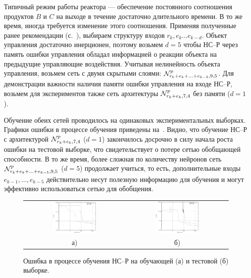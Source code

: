 Типичный режим работы реактора --- обеспечение постоянного соотношения
продуктов $B$ и $C$ на выходе в течение достаточно длительного
времени.  В то же время, иногда требуется изменение этого соотношения.
Применяя полученные ранее рекомендации
(с.~\pageref{nnc-inputs-rules}), выбираем структуру входов
$r_k,e_k\ldots e_{k-d}$.  Объект управления достаточно инерционен,
поэтому возьмем $d=5$ чтобы НС--Р через память ошибки управления
обладал информацией о реакции объекта на предыдущие управляющие
воздействия.  Учитывая нелинейность объекта управления, возьмем сеть с
двумя скрытыми слоями: $\mathcal{N}^p_{r_k+e_k+\ldots+e_{k-5},9,5}$.  Для
демонстрации важности наличия памяти ошибки управления на входе НС--Р,
возьмем для экспериментов также сеть архитектуры $\mathcal{N}^p_{r_k+e_k,7,4}$
без памяти ($d=1$).

Обучение обеих сетей проводилось на одинаковых экспериментальных
выборках.  Графики ошибки в процессе обучения приведены
на~.  Видно, что обучение НС--Р
с архитектурой $\mathcal{N}^p_{r_k+e_k,7,4}$ ($d=1$) закончилось досрочно в
силу начала роста ошибки на тестовой выборке, что свидетельствует о
потере сетью обобщающей способности.  В то же время, более сложная по
количеству нейронов сеть $\mathcal{N}^p_{r_k+e_k+\ldots+e_{k-5},9,5}$ ($d=5$)
продолжает учиться, то есть, дополнительные входы
$e_{k-1},\ldots,e_{k-5}$ действительно несут полезную информацию для
обучения и могут эффективно использоваться сетью для обобщения.

\begin{figure}[h]
  \centering
  \begin{tabular}{cc}
    \includegraphics[width=0.45\textwidth,%
      totalheight=0.25\textheight]{cstr_e5r1_vs_e1r1_training_learn_rus}
    &
    \includegraphics[width=0.45\textwidth,%
      totalheight=0.25\textheight]{cstr_e5r1_vs_e1r1_training_test_rus} \\
    а) & б)
  \end{tabular}
  \caption{Ошибка в процессе обучения НС--Р на обучающей (а) и тестовой (б) выборке.}%
  \label{fig:cstr_e5r1_vs_e1r1_training}
\end{figure}

